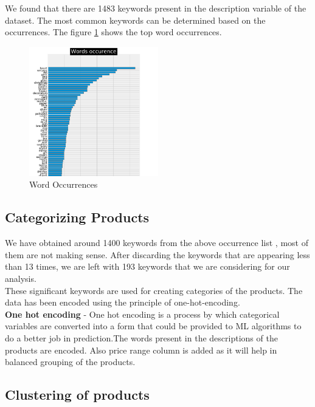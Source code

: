  We found that there are 1483 keywords present in the description variable of the dataset. The most common keywords can be determined based on the occurrences. The figure \ref{3.1} shows the top word occurrences.
 
 \begin{figure}[h]
\caption{Word Occurrences}
\label{3.1}
\centering
\includegraphics[width=0.5\textwidth]{images/3_1.PNG}
\end{figure}

\subsection*{Categorizing Products}

We have obtained around 1400 keywords from the above occurrence list , most of them are not making sense. After discarding the keywords that are appearing less than 13 times, we are left with 193 keywords that we are considering for our analysis.\\

These significant keywords are used for creating categories of the products. The data has been encoded using the principle of one-hot-encoding.\\

\textbf{One hot encoding} - One hot encoding is a process by which categorical variables are converted into a form that could be provided to ML algorithms to do a better job in prediction.The words present in the descriptions of the products are encoded. Also price range column is added as it will help in balanced grouping of the products.\\

\subsection*{Clustering of products}


